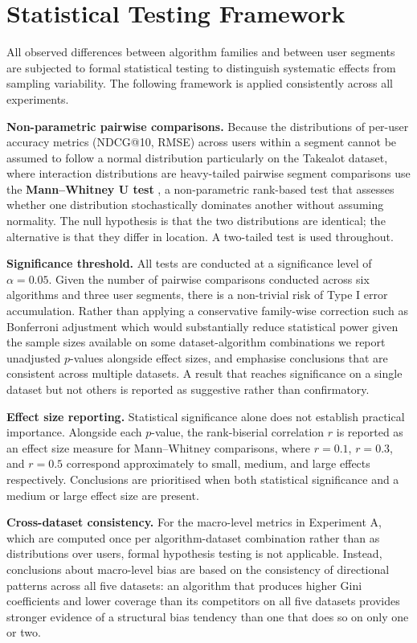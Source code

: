 \documentclass[11pt,a4paper]{report}
\begin{document}
\section{Statistical Testing Framework}
\label{sec:method_stats}

All observed differences between algorithm families and between user segments are subjected to formal statistical testing to distinguish systematic effects from sampling variability. The following framework is applied consistently across all experiments.

\textbf{Non-parametric pairwise comparisons.} Because the distributions of per-user accuracy metrics (NDCG@10, RMSE) across users within a segment cannot be assumed to follow a normal distribution particularly on the Takealot dataset, where interaction distributions are heavy-tailed pairwise segment comparisons use the \textbf{Mann--Whitney U test} \citep{demsar2006statistical}, a non-parametric rank-based test that assesses whether one distribution stochastically dominates another without assuming normality. The null hypothesis is that the two distributions are identical; the alternative is that they differ in location. A two-tailed test is used throughout.

\textbf{Significance threshold.} All tests are conducted at a significance level of $\alpha = 0.05$. Given the number of pairwise comparisons conducted across six algorithms and three user segments, there is a non-trivial risk of Type I error accumulation. Rather than applying a conservative family-wise correction such as Bonferroni adjustment which would substantially reduce statistical power given the sample sizes available on some dataset-algorithm combinations we report unadjusted $p$-values alongside effect sizes, and emphasise conclusions that are consistent across multiple datasets. A result that reaches significance on a single dataset but not others is reported as suggestive rather than confirmatory.

\textbf{Effect size reporting.} Statistical significance alone does not establish practical importance. Alongside each $p$-value, the rank-biserial correlation $r$ is reported as an effect size measure for Mann--Whitney comparisons, where $r = 0.1$, $r = 0.3$, and $r = 0.5$ correspond approximately to small, medium, and large effects respectively. Conclusions are prioritised when both statistical significance and a medium or large effect size are present.

\textbf{Cross-dataset consistency.} For the macro-level metrics in Experiment A, which are computed once per algorithm-dataset combination rather than as distributions over users, formal hypothesis testing is not applicable. Instead, conclusions about macro-level bias are based on the consistency of directional patterns across all five datasets: an algorithm that produces higher Gini coefficients and lower coverage than its competitors on all five datasets provides stronger evidence of a structural bias tendency than one that does so on only one or two.
\end{document}

